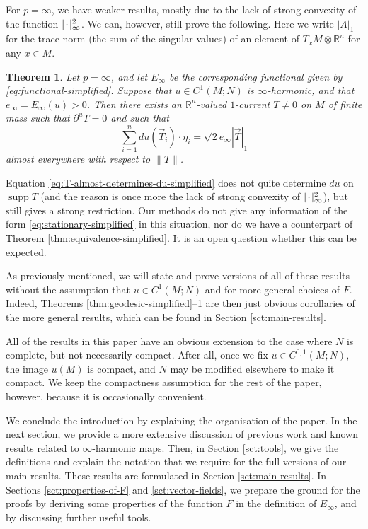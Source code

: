 \documentclass[a4paper]{article}
\newcommand{\R}{\mathbb{R}}
\DeclareMathOperator{\supp}{supp}
\newcommand{\blank}{{\mkern 2mu\cdot\mkern 2mu}}
\newtheorem{theorem}{Theorem}
\theoremstyle{definition}
\theoremstyle{remark}
\begin{document}
For $p = \infty$, we have weaker results, mostly due to the lack of strong convexity of the function $|\blank|_\infty^2$. We can, however, still prove the following. Here we write $|A|_1$ for the trace norm (the sum of the singular values) of an element of $T_x M \otimes \R^n$ for any $x \in M$.

\begin{theorem} \label{thm:weak-geodesic-simplified}
Let $p = \infty$, and let $E_\infty$ be the corresponding functional given by \eqref{eq:functional-simplified}. Suppose that $u \in C^1(M; N)$ is $\infty$-harmonic, and that $e_\infty = E_\infty(u) > 0$.
Then there exists an $\R^n$-valued $1$-current $T \neq 0$ on $M$ of finite mass such that
$\partial^u T = 0$ and such that
\begin{equation} \label{eq:T-almost-determines-du-simplified}
\sum_{i = 1}^n du(\vec{T}_i) \cdot \eta_i = \sqrt{2}e_\infty |\vec{T}|_1
\end{equation}
almost everywhere with respect to $\|T\|$.
\end{theorem}

Equation \eqref{eq:T-almost-determines-du-simplified} does not quite determine
$du$ on $\supp T$ (and the reason is once more the lack of strong convexity
of $|\blank|_\infty^2$), but still gives a strong restriction. Our methods
do not give any information of the form \eqref{eq:stationary-simplified} in this situation, nor do we have a counterpart of Theorem \ref{thm:equivalence-simplified}.
It is an open question whether this can be expected.

As previously mentioned, we will state and prove versions of all of these
results without the assumption that $u \in C^1(M; N)$ and for more general choices of $F$. Indeed, Theorems \ref{thm:geodesic-simplified}--\ref{thm:weak-geodesic-simplified} are then just obvious corollaries of the more
general results, which can be found in Section \ref{sct:main-results}.

All of the results in this paper have an obvious extension to the case
where $N$ is complete, but not necessarily compact. After all, once we
fix $u \in C^{0, 1}(M; N)$, the image $u(M)$ is compact, and $N$ may be
modified elsewhere to make it compact. We keep the compactness assumption
for the rest of the paper, however, because it is occasionally convenient.

We conclude the introduction by explaining the organisation of the paper.
In the next section, we provide a more extensive discussion of previous
work and known results related to $\infty$-harmonic maps. Then, in Section
\ref{sct:tools}, we give the definitions and explain the notation that
we require for the full versions of our main results.
These results are formulated in Section \ref{sct:main-results}.
In Sections \ref{sct:properties-of-F} and \ref{sct:vector-fields}, we prepare
the ground for the proofs by deriving some properties of the function $F$
in the definition of $E_\infty$, and by discussing further useful tools.
\end{document}
